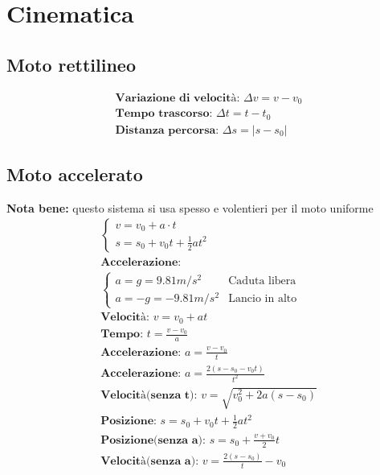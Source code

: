 \section{Cinematica}
\subsection{Moto rettilineo}
\begin{gather*}
\textbf{Variazione di velocità: } \Delta v = v - v_0 \\
\textbf{Tempo trascorso: } \Delta t = t - t_0 \\
\textbf{Distanza percorsa: } \Delta s = \left| s - s_0 \right|
\end{gather*}
\subsection{Moto accelerato}
\textbf{Nota bene: } questo sistema si usa spesso e volentieri per il moto uniforme
\begin{gather*}
\begin{cases}
    v = v_0 + a \cdot t \\
    s = s_0 + v_0 t + \frac{1}{2} a t^2
\end{cases}
\\
\textbf{Accelerazione:} \\
\begin{cases}
 a = g = 9.81 m/s^2 & \text{Caduta libera} \\
 a = -g = - 9.81m/s^2 & \text{Lancio in alto}
\end{cases}
\\
\textbf{Velocità: } v = v_0 + a t \\
\textbf{Tempo: } t = \frac{v - v_0}{a} \\
\textbf{Accelerazione: } a = \frac{v - v_0}{t} \\
\textbf{Accelerazione: } a = \frac{2 (s - s_0 - v_0 t)}{t^2} \\
\textbf{Velocità(senza t): } v = \sqrt{v_0^2 + 2 a (s - s_0)} \\
\textbf{Posizione: } s = s_0 + v_0 t + \frac{1}{2} a t^2 \\
\textbf{Posizione(senza a): } s = s_0 + \frac{v + v_0}{2} t \\
\textbf{Velocità(senza a): } v = \frac{2 (s - s_0)}{t} - v_0
\end{gather*}
